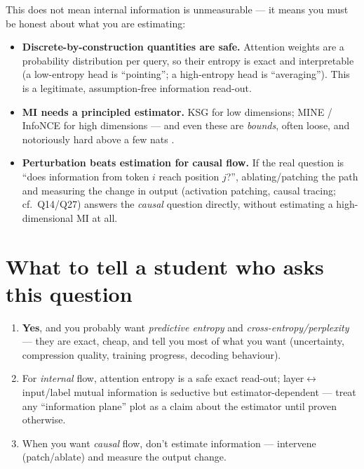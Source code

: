 \documentclass[11pt,letterpaper]{article}
\begin{document}
This does not mean internal information is unmeasurable --- it means you must be
honest about what you are estimating:
\begin{itemize}[noitemsep]
\item \textbf{Discrete-by-construction quantities are safe.} Attention weights are
  a probability distribution per query, so their entropy is exact and
  interpretable (a low-entropy head is ``pointing''; a high-entropy head is
  ``averaging''). This is a legitimate, assumption-free information read-out.
\item \textbf{MI needs a principled estimator.} KSG \citep{kraskov2004ksg} for
  low dimensions; MINE / InfoNCE \citep{belghazi2018mine,vanderoord2018cpc} for
  high dimensions --- and even these are \emph{bounds}, often loose, and
  notoriously hard above a few nats \citep{mcallester2020limitations}.
\item \textbf{Perturbation beats estimation for causal flow.} If the real question
  is ``does information from token $i$ reach position $j$?'', ablating/patching the
  path and measuring the change in output (activation patching, causal tracing;
  cf.\ Q14/Q27) answers the \emph{causal} question directly, without estimating a
  high-dimensional MI at all.
\end{itemize}

\section{What to tell a student who asks this question}

\begin{enumerate}[noitemsep]
\item \textbf{Yes}, and you probably want \emph{predictive entropy} and
  \emph{cross-entropy/perplexity} --- they are exact, cheap, and tell you most of
  what you want (uncertainty, compression quality, training progress, decoding
  behaviour).
\item For \emph{internal} flow, attention entropy is a safe exact read-out;
  layer$\leftrightarrow$input/label mutual information is seductive but
  estimator-dependent --- treat any ``information plane'' plot as a claim about the
  estimator until proven otherwise.
\item When you want \emph{causal} flow, don't estimate information --- intervene
  (patch/ablate) and measure the output change.
\end{enumerate}
\end{document}
